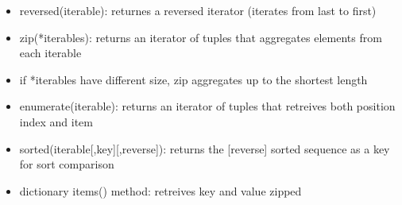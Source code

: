 \documentclass[11pt]{article}
\providecommand{\tightlist}{%
      \setlength{\itemsep}{0pt}\setlength{\parskip}{0pt}}
\begin{document}
\begin{itemize}
\tightlist
\item
  reversed(iterable): returnes a reversed iterator (iterates from last
  to first)
\item
  zip(*iterables): returns an iterator of tuples that aggregates
  elements from each iterable
\item
  if *iterables have different size, zip aggregates up to the shortest
  length
\item
  enumerate(iterable): returns an iterator of tuples that retreives both
  position index and item\\
\item
  sorted(iterable{[},key{]}{[},reverse{]}): returns the {[}reverse{]}
  sorted sequence as a key for sort comparison
\item
  dictionary items() method: retreives key and value zipped
\end{itemize}
\end{document}
